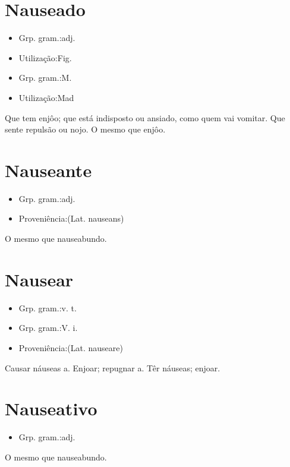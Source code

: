 \section{Nauseado}
\begin{itemize}
\item {Grp. gram.:adj.}
\end{itemize}
\begin{itemize}
\item {Utilização:Fig.}
\end{itemize}
\begin{itemize}
\item {Grp. gram.:M.}
\end{itemize}
\begin{itemize}
\item {Utilização:Mad}
\end{itemize}
Que tem enjôo; que está indisposto ou ansiado, como quem vai vomitar.
Que sente repulsão ou nojo.
O mesmo que \textunderscore enjôo\textunderscore .
\section{Nauseante}
\begin{itemize}
\item {Grp. gram.:adj.}
\end{itemize}
\begin{itemize}
\item {Proveniência:(Lat. \textunderscore nauseans\textunderscore )}
\end{itemize}
O mesmo que \textunderscore nauseabundo\textunderscore .
\section{Nausear}
\begin{itemize}
\item {Grp. gram.:v. t.}
\end{itemize}
\begin{itemize}
\item {Grp. gram.:V. i.}
\end{itemize}
\begin{itemize}
\item {Proveniência:(Lat. \textunderscore nauseare\textunderscore )}
\end{itemize}
Causar náuseas a.
Enjoar; repugnar a.
Têr náuseas; enjoar.
\section{Nauseativo}
\begin{itemize}
\item {Grp. gram.:adj.}
\end{itemize}
O mesmo que \textunderscore nauseabundo\textunderscore .

